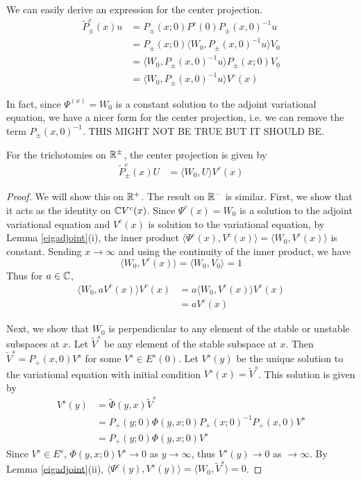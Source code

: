 \documentclass[thesis.tex]{subfiles}
\begin{document}
We can easily derive an expression for the center projection.
\begin{align*}
\tilde{P}^c_\pm(x) u &= P_\pm(x; 0) P^c(0) P_\pm(x, 0)^{-1} u \\
&= P_\pm(x; 0) \langle W_0, P_\pm(x, 0)^{-1} u \rangle V_0 \\
&= \langle W_0, P_\pm(x, 0)^{-1} u \rangle P_\pm(x; 0) V_0\\
&= \langle W_0, P_\pm(x, 0)^{-1} u \rangle V^c(x)
\end{align*}

In fact, since $\Psi^(x) = W_0$ is a constant solution to the adjoint variational equation, we have a nicer form for the center projection, i.e. we can remove the term $P_\pm(x, 0)^{-1}$. THIS MIGHT NOT BE TRUE BUT IT SHOULD BE.

\begin{lemma}\label{centerprojlemma}
For the trichotomies on $\mathbb{R}^\pm$, the center projection is given by 
\begin{align}
\tilde{P}^c_\pm(x) U &= \langle W_0, U \rangle V^c(x)
\end{align}
\begin{proof}
We will show this on $\mathbb{R}^+$. The result on $\mathbb{R}^-$ is similar. First, we show that it acts as the identity on $\mathbb{C} V^c(x)$. Since $\Psi^c(x) = W_0$ is a solution to the adjoint variational equation and $V^c(x)$ is solution to the variational equation, by Lemma \ref{eigadjoint}(i), the inner product $\langle \Psi^c(x), V^c(x) \rangle = \langle W_0, V^c(x) \rangle$ is constant. Sending $x \rightarrow \infty$ and using the continuity of the inner product, we have
\[
\langle W_0, V^c(x) \rangle = \langle W_0, V_0 \rangle = 1
\]
Thus for $a \in \mathbb{C}$,
\begin{align*}
\langle W_0, a V^c(x) \rangle V^c(x) 
&= a \langle W_0, V^c(x) \rangle V^c(x) \\
&= a V^c(x)
\end{align*}

Next, we show that $W_0$ is perpendicular to any element of the stable or unstable subspaces at $x$. Let $\tilde{V}^s$ be any element of the stable subspace at $x$. Then $\tilde{V}^s = P_+(x, 0) V^s$ for some $V^s \in E^s(0)$. Let $V^s(y)$ be the unique solution to the variational equation with initial condition $V^s(x) = \tilde{V}^s$. This solution is given by
\begin{align*}
V^s(y) &= \tilde{\Phi}(y,x)\tilde{V}^s \\
&= P_+(y; 0) \Phi(y, x; 0) P_+(x; 0)^{-1} P_+(x, 0) V^s \\
&= P_+(y; 0) \Phi(y, x; 0) V^s
\end{align*}
Since $V^s \in E^s$, $\Phi(y, x; 0) V^s \rightarrow 0$ as $y \rightarrow \infty$, thus $V^s(y) \rightarrow 0$ as $ \rightarrow \infty$. By Lemma \ref{eigadjoint}(ii), $\langle \Psi^c(y), V^s(y) \rangle = \langle W_0, \tilde{V}^s \rangle = 0$.
\end{proof}
\end{lemma}
\end{document}
